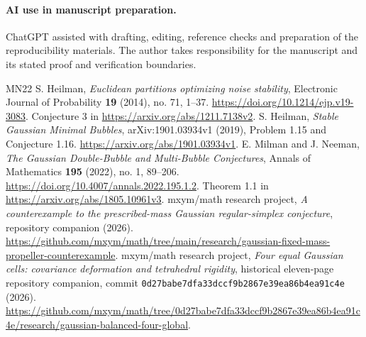 \documentclass[11pt]{article}
\begin{document}
\paragraph{AI use in manuscript preparation.} ChatGPT assisted with drafting, editing, reference checks and preparation of the reproducibility materials. The author takes responsibility for the manuscript and its stated proof and verification boundaries.
\begin{thebibliography}{MN22}
 S. Heilman, \emph{Euclidean partitions optimizing noise stability}, Electronic Journal of Probability \textbf{19} (2014), no. 71, 1--37. \url{https://doi.org/10.1214/ejp.v19-3083}. Conjecture 3 in \url{https://arxiv.org/abs/1211.7138v2}.
 S. Heilman, \emph{Stable Gaussian Minimal Bubbles}, arXiv:1901.03934v1 (2019), Problem 1.15 and Conjecture 1.16. \url{https://arxiv.org/abs/1901.03934v1}.
 E. Milman and J. Neeman, \emph{The Gaussian Double-Bubble and Multi-Bubble Conjectures}, Annals of Mathematics \textbf{195} (2022), no. 1, 89--206. \url{https://doi.org/10.4007/annals.2022.195.1.2}. Theorem 1.1 in \url{https://arxiv.org/abs/1805.10961v3}.
 mxym/math research project, \emph{A counterexample to the prescribed-mass Gaussian regular-simplex conjecture}, repository companion (2026). \url{https://github.com/mxym/math/tree/main/research/gaussian-fixed-mass-propeller-counterexample}.
 mxym/math research project, \emph{Four equal Gaussian cells: covariance deformation and tetrahedral rigidity}, historical eleven-page repository companion, commit \texttt{0d27babe7dfa33dccf9b2867e39ea86b4ea91c4e} (2026). \url{https://github.com/mxym/math/tree/0d27babe7dfa33dccf9b2867e39ea86b4ea91c4e/research/gaussian-balanced-four-global}.
\end{thebibliography}
\end{document}
